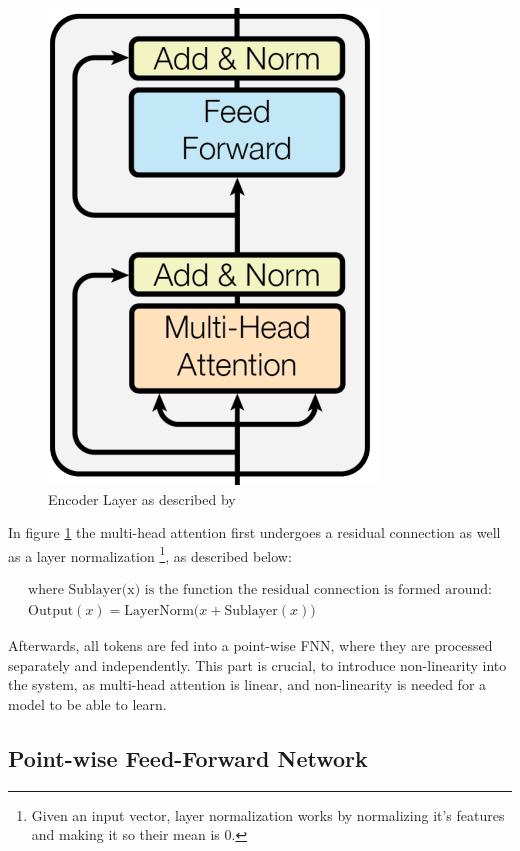 \documentclass{article}
\begin{document}
\begin{figure}
    \centering
    \includegraphics[width=0.2\paperwidth]{images/encodingLayer.png}
    \caption{Encoder Layer as described by \cite{vaswani2023attentionneed}}
    \label{fig:encodingLayer}
\end{figure}

In figure \ref{fig:encodingLayer} the multi-head attention first undergoes 
a residual connection as well as a layer normalization \footnote{Given an input 
vector, layer normalization works by normalizing it's features and making it so 
their mean is 0.}, as described below:

\begin{gather}
    \text{where Sublayer(x) is the function the residual connection is formed 
    around:} \nonumber \\
    \text{Output}(x) = \text{LayerNorm}\bigl(x + \text{Sublayer}(x)\bigr) \label{eq:ResConnect}
\end{gather}

Afterwards, all tokens are fed into a point-wise FNN, where they are processed 
separately and independently. This part is crucial, to introduce non-linearity 
into the system, as multi-head attention is linear, and non-linearity is needed 
for a model to be able to learn.

\subsection{Point-wise Feed-Forward Network}
\end{document}
